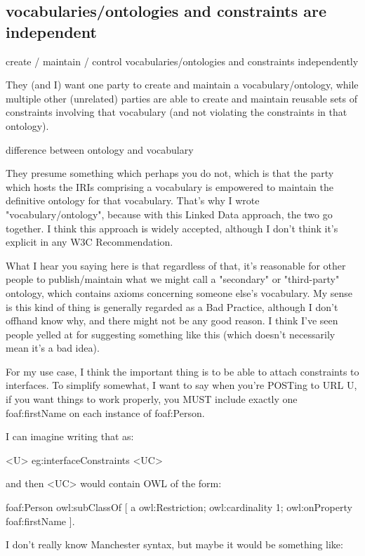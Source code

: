\documentclass{llncs}
\begin{document}
\subsection{vocabularies/ontologies and constraints are independent}

create / maintain / control vocabularies/ontologies and constraints independently

They (and I) want one party to create and maintain a
vocabulary/ontology, while multiple other (unrelated) parties are able
to create and maintain reusable sets of constraints involving that
vocabulary (and not violating the constraints in that ontology).
 
difference between ontology and vocabulary

They presume something which perhaps you do not, which is that the
party which hosts the IRIs comprising a vocabulary is empowered to
maintain the definitive ontology for that vocabulary.  That's why I
wrote "vocabulary/ontology", because with this Linked Data approach, the
two go together.  I think this approach is widely accepted, although I
don't think it's explicit in any W3C Recommendation. 
 
What I hear you saying here is that regardless of that, it's reasonable
for other people to publish/maintain what we might call a "secondary" or
"third-party" ontology, which contains axioms concerning someone else's
vocabulary.    My sense is this kind of thing is generally regarded as a
Bad Practice, although I don't offhand know why, and there might not be
any good reason.  I think I've seen people yelled at for suggesting
something like this (which doesn't necessarily mean it's a bad idea).
 
For my use case, I think the important thing is to be able to attach
constraints to interfaces.  To simplify somewhat, I want to say when
you're POSTing to URL U, if you want things to work properly, you MUST
include exactly one foaf:firstName on each instance of foaf:Person.
 
I can imagine writing that as:
 
    <U> eg:interfaceConstraints <UC>
 
and then <UC> would contain OWL of the form:
 
    foaf:Person owl:subClassOf [
       a owl:Restriction;
       owl:cardinality 1;
       owl:onProperty foaf:firstName
    ].
 
I don't really know Manchester syntax, but maybe it would be something like:
 
\end{document}
